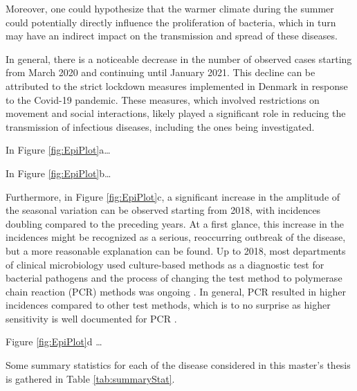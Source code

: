 \documentclass[a4paper,twoside,11pt]{report} %
\theoremstyle{definition}
\theoremstyle{definition}
\theoremstyle{definition}
\theoremstyle{definition}
\theoremstyle{remark}
\begin{document}
Moreover, one could hypothesize that the warmer climate during the summer could potentially directly influence the proliferation of bacteria, which in turn may have an indirect impact on the transmission and spread of these diseases.

In general, there is a noticeable decrease in the number of observed cases starting from March 2020 and continuing until January 2021. This decline can be attributed to the strict lockdown measures implemented in Denmark in response to the Covid-19 pandemic. These measures, which involved restrictions on movement and social interactions, likely played a significant role in reducing the transmission of infectious diseases, including the ones being investigated.

In Figure \ref{fig:EpiPlot}a\ldots{}

In Figure \ref{fig:EpiPlot}b\ldots{}

Furthermore, in Figure \ref{fig:EpiPlot}c, a significant increase in the amplitude of the seasonal variation can be observed starting from 2018, with incidences doubling compared to the preceding years. At a first glance, this increase in the incidences might be recognized as a serious, reoccurring outbreak of the disease, but a more reasonable explanation can be found. Up to 2018, most departments of clinical microbiology used culture-based methods as a diagnostic test for bacterial pathogens and the process of changing the test method to polymerase chain reaction (PCR) methods was ongoing \autocite{Svendsen_2023}. In general, PCR resulted in higher incidences compared to other test methods, which is to no surprise as higher sensitivity is well documented for PCR \autocite{Buss_2015,Knabl_2016}.

Figure \ref{fig:EpiPlot}d \ldots{}

Some summary statistics for each of the disease considered in this master's thesis is gathered in Table \ref{tab:summaryStat}.
\end{document}
